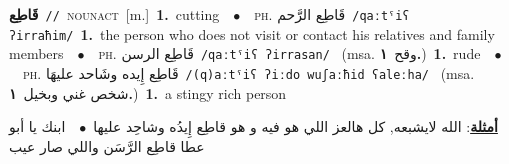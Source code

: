 \documentclass[10pt,a4paper,twoside]{article} %
\begin{document}
\begin{multicols}{2}
{\setlength\topsep{0pt}\textbf{\foreignlanguage{arabic}{قَاطِع}}\ {\color{gray}\texttt{//}\color{black}}\ \textsc{noun\textunderscore act}\ [m.]\ \textbf{1.}~cutting\ \ $\bullet$\ \ \textsc{ph.} \color{gray} \foreignlanguage{arabic}{قَاطِع الرَّحم}\color{black}\ {\color{gray}\texttt{/{\sffamily qaːtˤiʕ ʔirraħim}/}\color{black}}\ \textbf{1.}~the person who does not visit or contact his relatives and family members\ \ $\bullet$\ \ \textsc{ph.} \color{gray} \foreignlanguage{arabic}{قَاطِع الرسن}\color{black}\ {\color{gray}\texttt{/{\sffamily qaːtˤiʕ ʔirrasan}/}\color{black}}\ \color{gray} (msa. \foreignlanguage{arabic}{وقح}~\foreignlanguage{arabic}{\textbf{١.}})\color{black}\ \textbf{1.}~rude\ \ $\bullet$\ \ \textsc{ph.} \color{gray} \foreignlanguage{arabic}{قَاطِع إِيده وشَاحد عليهَا}\color{black}\ {\color{gray}\texttt{/{\sffamily (q)aːtˤiʕ ʔiːdo wuʃaːħid ʕaleːha}/}\color{black}}\ \color{gray} (msa. \foreignlanguage{arabic}{شخص غني وبخيل}~\foreignlanguage{arabic}{\textbf{١.}})\color{black}\ \textbf{1.}~a stingy rich person\  \begin{flushright}\color{gray}\foreignlanguage{arabic}{\textbf{\underline{\foreignlanguage{arabic}{أمثلة}}}: الله لايشبعه, كل هالعز اللي هو فيه و هو قاطِع إِيدُه وشاحِد عليها\ $\bullet$\ \  ابنك يا أبو عطا قاطِع الرَّسَن واللي صار عيب}\end{flushright}\color{black}} \vspace{2mm}


\end{multicols}
\end{document}
